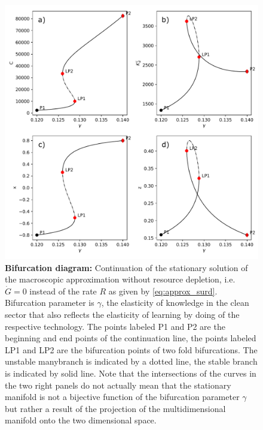 \begin{figure}[ht!]
\centering\includegraphics[width=.95\linewidth]{figures/ba_plot.pdf}
\caption[Bifurcation diagram for learning rate in the clean sector]{\textbf{Bifurcation diagram:} Continuation of the stationary solution of the macroscopic approximation without resource depletion, i.e. $\dot{G} = 0$ instead of the rate $R$ as given by  \cref{eq:approx_surd}. Bifurcation parameter is $\gamma$, the elasticity of knowledge in the clean sector that also reflects the elasticity of learning by doing of the respective technology. The points labeled P1 and P2 are the beginning and end points of the continuation line, the points labeled LP1 and LP2 are the bifurcation points of two fold bifurcations. The unstable manybranch is indicated by a dotted line, the stable branch is indicated by solid line. Note that the intersections of the curves in the two right panels do not actually mean that the stationary manifold is not a bijective function of the bifurcation parameter $\gamma$ but rather a result of the projection of the multidimensional manifold onto the two dimensional space.\label{fig:bifurcation_analysis}}
\end{figure}

